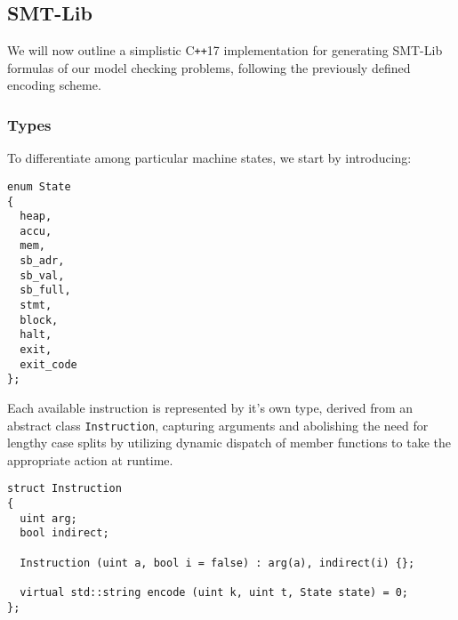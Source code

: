 
\newpage
\subsection{SMT-Lib}

\newcommand{\Cpp}{C\texttt{++}17 }

We will now outline a simplistic \Cpp implementation for generating SMT-Lib formulas of our model checking problems, following the previously defined encoding scheme.

\subsubsection{Types}

To differentiate among particular machine states, we start by introducing:%


\begin{lstlisting}[style=c++]
enum State
{
  heap,
  accu,
  mem,
  sb_adr,
  sb_val,
  sb_full,
  stmt,
  block,
  halt,
  exit,
  exit_code
};
\end{lstlisting}
Each available instruction is represented by it's own type, derived from an abstract class \texttt{Instruction}, capturing arguments and abolishing the need for lengthy case splits by utilizing dynamic dispatch of member functions to take the appropriate action at runtime.%
\begin{lstlisting}[style=c++]
struct Instruction
{
  uint arg;
  bool indirect;

  Instruction (uint a, bool i = false) : arg(a), indirect(i) {};

  virtual std::string encode (uint k, uint t, State state) = 0;
};
\end{lstlisting}

